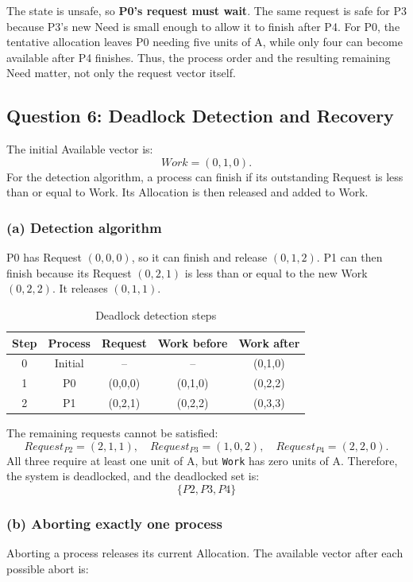 \documentclass[conference]{IEEEtran}
\begin{document}
The state is unsafe, so \textbf{P0's request must wait}. The same request is safe for P3 because P3's new Need is small enough to allow it to finish after P4. For P0, the tentative allocation leaves P0 needing five units of A, while only four can become available after P4 finishes. Thus, the process order and the resulting remaining Need matter, not only the request vector itself.

\subsection{Question 6: Deadlock Detection and Recovery}

The initial Available vector is:
\[
Work=(0,1,0).
\]
For the detection algorithm, a process can finish if its outstanding Request is less than or equal to Work. Its Allocation is then released and added to Work.

\subsubsection{(a) Detection algorithm}
P0 has Request \((0,0,0)\), so it can finish and release \((0,1,2)\). P1 can then finish because its Request \((0,2,1)\) is less than or equal to the new Work \((0,2,2)\). It releases \((0,1,1)\).

\begin{table}[H]
\centering
\caption{Deadlock detection steps}
\small
\begin{tabular}{c|c|c|c|c}
Step & Process & Request & Work before & Work after\\ \hline
0 & Initial & -- & -- & (0,1,0)\\
1 & P0 & (0,0,0) & (0,1,0) & (0,2,2)\\
2 & P1 & (0,2,1) & (0,2,2) & (0,3,3)
\end{tabular}
\end{table}

The remaining requests cannot be satisfied:
\[
Request_{P2}=(2,1,1),\quad
Request_{P3}=(1,0,2),\quad
Request_{P4}=(2,2,0).
\]
All three require at least one unit of A, but \texttt{Work} has zero units of A. Therefore, the system is deadlocked, and the deadlocked set is:
\[
\boxed{\{P2,P3,P4\}}
\]

\subsubsection{(b) Aborting exactly one process}
Aborting a process releases its current Allocation. The available vector after each possible abort is:
\end{document}
